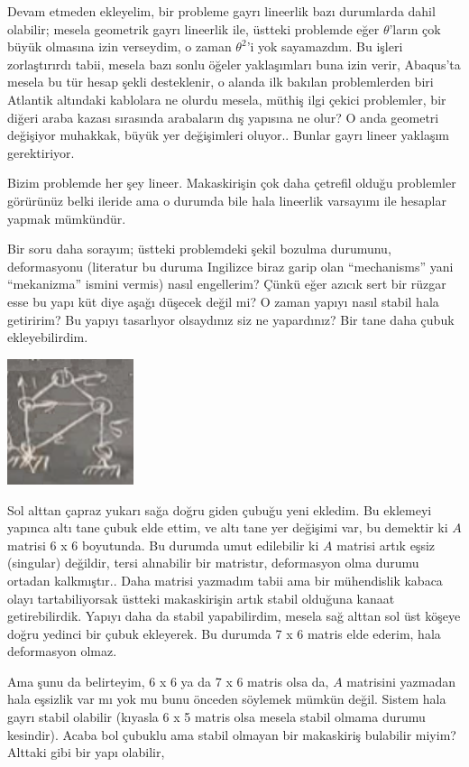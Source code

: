 \documentclass[12pt,fleqn]{article}\usepackage{../../common}
\begin{document}
Devam etmeden ekleyelim, bir probleme gayrı lineerlik bazı durumlarda dahil
olabilir; mesela geometrik gayrı lineerlik ile, üstteki problemde eğer
$\theta$'ların çok büyük olmasına izin verseydim, o zaman $\theta^2$'i yok
sayamazdım. Bu işleri zorlaştırırdı tabii, mesela bazı sonlu öğeler yaklaşımları
buna izin verir, Abaqus'ta mesela bu tür hesap şekli desteklenir, o alanda ilk
bakılan problemlerden biri Atlantik altındaki kablolara ne olurdu mesela, müthiş
ilgi çekici problemler, bir diğeri araba kazası sırasında arabaların dış
yapısına ne olur? O anda geometri değişiyor muhakkak, büyük yer değişimleri
oluyor.. Bunlar gayrı lineer yaklaşım gerektiriyor.

Bizim problemde her şey lineer. Makaskirişin çok daha çetrefil olduğu problemler
görürünüz belki ileride ama o durumda bile hala lineerlik varsayımı ile hesaplar
yapmak mümkündür.

Bir soru daha sorayım; üstteki problemdeki şekil bozulma durumunu, deformasyonu
(literatur bu duruma Ingilizce biraz garip olan ``mechanisms'' yani
``mekanizma'' ismini vermis) nasıl engellerim? Çünkü eğer azıcık sert bir rüzgar
esse bu yapı küt diye aşağı düşecek değil mi? O zaman yapıyı nasıl stabil hala
getiririm? Bu yapıyı tasarlıyor olsaydınız siz ne yapardınız? Bir tane daha
çubuk ekleyebilirdim.

\includegraphics[width=10em]{compscieng_1_15_05.png}

Sol alttan çapraz yukarı sağa doğru giden çubuğu yeni ekledim. Bu eklemeyi
yapınca altı tane çubuk elde ettim, ve altı tane yer değişimi var, bu demektir
ki $A$ matrisi 6 x 6 boyutunda. Bu durumda umut edilebilir ki $A$ matrisi artık
eşsiz (singular) değildir, tersi alınabilir bir matristır, deformasyon olma
durumu ortadan kalkmıştır.. Daha matrisi yazmadım tabii ama bir mühendislik
kabaca olayı tartabiliyorsak üstteki makaskirişin artık stabil olduğuna kanaat
getirebilirdik. Yapıyı daha da stabil yapabilirdim, mesela sağ alttan sol üst
köşeye doğru yedinci bir çubuk ekleyerek. Bu durumda 7 x 6 matris elde ederim,
hala deformasyon olmaz.

Ama şunu da belirteyim, 6 x 6 ya da 7 x 6 matris olsa da, $A$ matrisini yazmadan
hala eşsizlik var mı yok mu bunu önceden söylemek mümkün değil. Sistem hala
gayrı stabil olabilir (kıyasla 6 x 5 matris olsa mesela stabil olmama durumu
kesindir). Acaba bol çubuklu ama stabil olmayan bir makaskiriş bulabilir miyim?
Alttaki gibi bir yapı olabilir,
\end{document}

